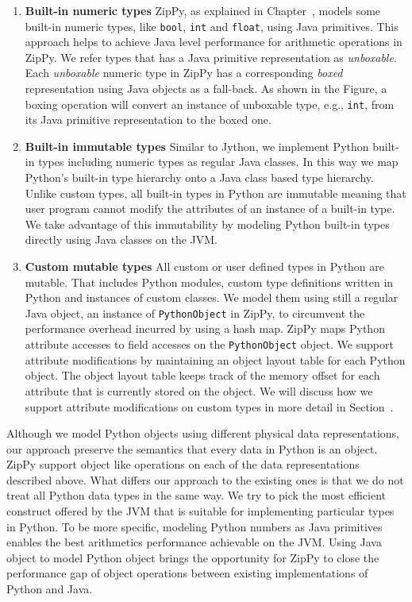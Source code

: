 \begin{enumerate}

\item \textbf{Built-in numeric types}
ZipPy, as explained in Chapter~, models some built-in numeric types, like \texttt{bool}, \texttt{int} and \texttt{float}, using Java primitives.
This approach helps to achieve Java level performance for arithmetic operations in ZipPy.
We refer types that has a Java primitive representation as \emph{unboxable}.
Each \emph{unboxable} numeric type in ZipPy has a corresponding \emph{boxed} representation using Java objects as a fall-back.
As shown in the Figure, a boxing operation will convert an instance of unboxable type, e.g., \texttt{int}, from its Java primitive representation to the boxed one.

\item \textbf{Built-in immutable types}
Similar to Jython, we implement Python built-in types including numeric types as regular Java classes.
In this way we map Python's built-in type hierarchy onto a Java class based type hierarchy.
Unlike custom types, all built-in types in Python are immutable meaning that user program cannot modify the attributes of an instance of a built-in type.
We take advantage of this immutability by modeling Python built-in types directly using Java classes on the JVM.

\item \textbf{Custom mutable types}
All custom or user defined types in Python are mutable.
That includes Python modules, custom type definitions written in Python and instances of custom classes.
We model them using still a regular Java object, an instance of \texttt{PythonObject} in ZipPy, to circumvent the performance overhead incurred by using a hash map.
ZipPy maps Python attribute accesses to field accesses on the \texttt{PythonObject} object.
We support attribute modifications by maintaining an object layout table for each Python object.
The object layout table keeps track of the memory offset for each attribute that is currently stored on the object.
We will discuss how we support attribute modifications on custom types in more detail in Section~.

\end{enumerate}

Although we model Python objects using different physical data representations, our approach preserve the semantics that every data in Python is an object.
ZipPy support object like operations on each of the data representations described above.
What differs our approach to the existing ones is that we do not treat all Python data types in the same way.
We try to pick the most efficient construct offered by the JVM that is suitable for implementing particular types in Python.
To be more specific, modeling Python numbers as Java primitives enables the best arithmetics performance achievable on the JVM.
Using Java object to model Python object brings the opportunity for ZipPy to close the performance gap of object operations between existing implementations of Python and Java.




